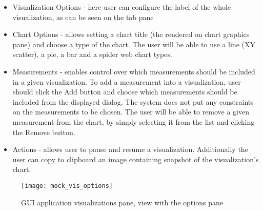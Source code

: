 \begin{itemize}

\item Visualization Options - here user can configure the label of the whole visualization, as can be seen on the tab pane

\item Chart Options - allows setting a chart title (the rendered on chart graphics pane) and choose a type of the chart. The user will be able to use a line (XY scatter), a pie, a bar and a spider web chart types.

\item Measurements - enables control over which measurements should be included in a given visualization. To add a measurement into a visualization, user should click the Add button and choose which measurements should be included from the displayed dialog. The system does not put any constraints on the measurements to be chosen. The user will be able to remove a given measurement from the chart, by simply selecting it from the list and clicking the Remove button.

\item Actions - allows user to pause and resume a visualization. Additionally the user can copy to clipboard an image containing snapshot of the visualization's chart.
\end{itemize}

\begin{figure}[ht]
\centering
\texttt{[image: mock\_vis\_options]}
\caption{GUI application visualizations pane, view with the options pane}
\label{fig:mock_vis_options}
\end{figure}

